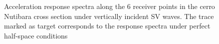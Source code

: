 \documentclass[11pt,letterpaper]{article}
\begin{document}
\begin{figure}[H]
	\center
	\caption{\small Acceleration response spectra along the 6 receiver points in the cerro Nutibara cross section under vertically incident SV waves. The trace marked as target corresponds to the response spectra under perfect half-space conditions}
 \label{fig:SaptosNutEWSV_fisica}
\end{figure}
\end{document}
